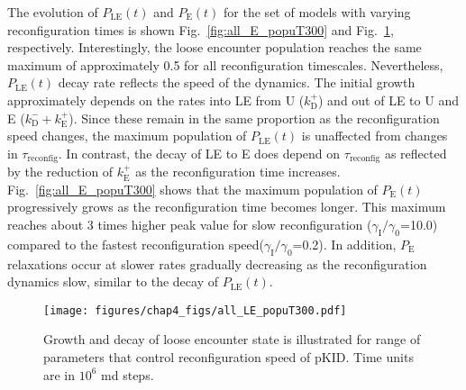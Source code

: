 \documentclass[../talant.diss.submit.tex]{subfiles}
\begin{document}
%                                                                                                           
%
The evolution of $P_\mathrm{LE}(t)$ and $P_\mathrm{E}(t)$ for the set
of models with varying reconfiguration times is shown 
Fig.~\ref{fig:all_E_popuT300} and Fig.~\ref{fig:all_LE_popuT300}, respectively. 
Interestingly, the loose encounter population reaches the same maximum
of approximately 0.5 for all reconfiguration timescales. Nevertheless, $P_\mathrm{LE}(t)$
decay rate reflects the speed of the dynamics. 
The initial growth approximately depends on the rates into LE from U ($k_\mathrm{D}^+$) and out of LE
to U and E ($k_\mathrm{D}^- + k_\mathrm{E}^+$). Since these remain in the same proportion
as the reconfiguration speed changes, the maximum population of $P_\mathrm{LE}(t)$ is unaffected
from changes in $\tau_\mathrm{reconfig}$.
In contrast, the decay of LE to E does depend on $\tau_\mathrm{reconfig}$ as reflected by the reduction
of  $k_\mathrm{E}^{+}$ as the reconfiguration time increases.
Fig.~\ref{fig:all_E_popuT300} shows that the maximum population of $P_\mathrm{E}(t)$
progressively grows as the reconfiguration time becomes longer. This maximum reaches about
3 times higher peak value for slow reconfiguration ($\gamma_{\mathrm{I}} / \gamma_0$=10.0)
compared to the fastest reconfiguration speed($\gamma_{\mathrm{I}} / \gamma_0$=0.2).
In addition, $P_{\mathrm{E}}$ relaxations occur at
slower rates gradually decreasing as the reconfiguration dynamics slow, similar to the decay of
$P_\mathrm{LE}(t)$.

\begin{figure}[htp!]
  \begin{centering}                                                                                        
    \texttt{[image: figures/chap4\_figs/all\_LE\_popuT300.pdf]}
    \caption{Growth and decay of loose encounter state is illustrated for
      range of parameters that control reconfiguration speed of pKID.
      Time units are in $10^{6}$ md steps.}                    
   \label{fig:all_LE_popuT300}                                                                                 
  \end{centering}
\end{figure}
\end{document}

